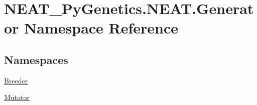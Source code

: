 \hypertarget{namespaceNEAT__PyGenetics_1_1NEAT_1_1Generator}{}\section{N\+E\+A\+T\+\_\+\+Py\+Genetics.\+N\+E\+A\+T.\+Generator Namespace Reference}
\label{namespaceNEAT__PyGenetics_1_1NEAT_1_1Generator}
\subsection*{Namespaces}
\begin{DoxyCompactItemize}
\item 
 \hyperlink{namespaceNEAT__PyGenetics_1_1NEAT_1_1Generator_1_1Breeder}{Breeder}
\item 
 \hyperlink{namespaceNEAT__PyGenetics_1_1NEAT_1_1Generator_1_1Mutator}{Mutator}
\end{DoxyCompactItemize}
